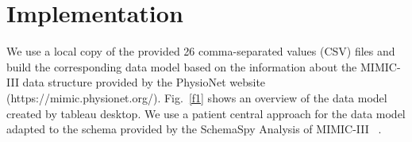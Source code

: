 \documentclass[aac,crcready]{iosart2x}
\begin{document}

\section{Implementation}\label{s4}
%
We use a local copy of the provided 26 comma-separated values (CSV) files and build the corresponding data model based on the information about the MIMIC-III data structure provided by the PhysioNet website (https://mimic.physionet.org/). Fig.~\ref{f1} shows an overview of the data model created by tableau desktop. We use a patient central approach for the data model adapted to the schema provided by the SchemaSpy Analysis of MIMIC-III ~\cite{SchemaSpy.2017}. 
\end{document}

